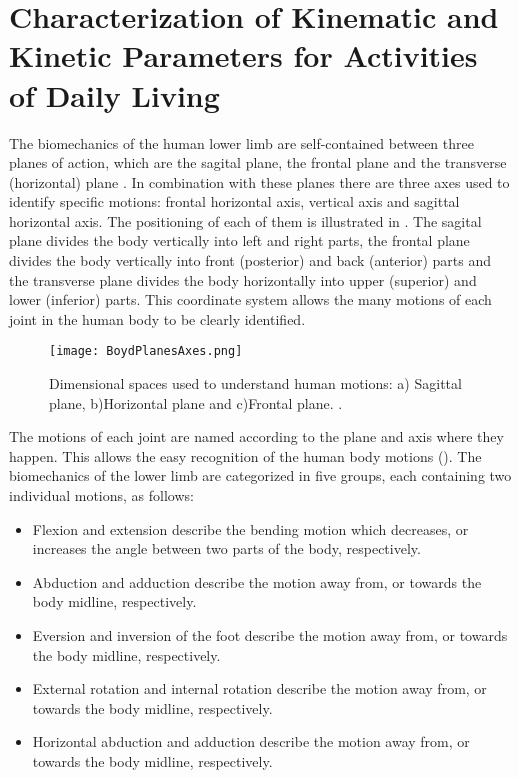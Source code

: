 \section{Characterization of Kinematic and Kinetic Parameters for Activities of Daily Living} \label{sec:characterizationKKP}

The biomechanics of the human lower limb are self-contained between three planes of action, which are the sagital plane, the frontal plane and the transverse (horizontal) plane \cite{PhysicalSolutions2016}. In combination with these planes there are three axes used to identify specific motions: frontal horizontal axis, vertical axis and sagittal horizontal axis. The positioning of each of them is illustrated in . The sagital plane divides the body vertically into left and right parts, the frontal plane divides the body vertically into front (posterior) and back (anterior) parts and the transverse plane divides the body horizontally into upper (superior) and lower (inferior) parts. This coordinate system allows the many motions of each joint in the human body to be clearly identified.

\begin{figure}[htbp!]
    \centering
    \texttt{[image: BoydPlanesAxes.png]}
    \caption{Dimensional spaces used to understand human motions: a) Sagittal plane, b)Horizontal plane and c)Frontal plane. \cite{PhysicalSolutions2016}. }
    \label{fig:body_planes_axes}
\end{figure}

\newpage
The motions of each joint are named according to the plane and axis where they happen. This allows the easy recognition of the human body motions (). The biomechanics of the lower limb are categorized in five groups, each containing two individual motions, as follows:
\begin{itemize}
    \item Flexion and extension describe the bending motion which decreases, or increases the angle between two parts of the body, respectively.
    \item Abduction and adduction describe the motion away from, or towards the body midline, respectively.
    \item Eversion and inversion of the foot describe the motion away from, or towards the body midline, respectively.
    \item External rotation and internal rotation describe the motion away from, or towards the body midline, respectively.
    \item Horizontal abduction and adduction describe the motion away from, or towards the body midline, respectively.
\end{itemize}


